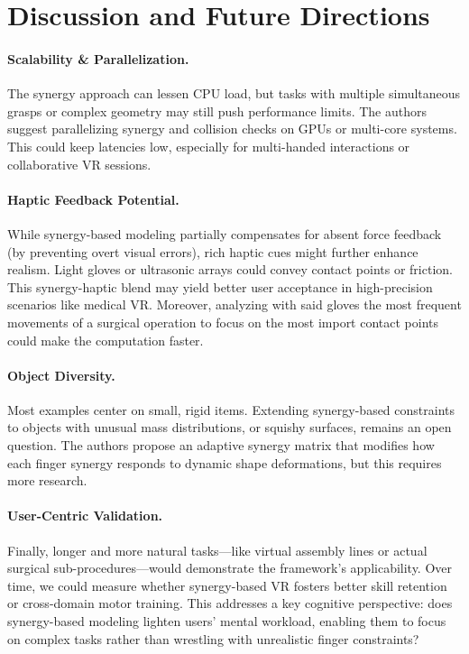 \documentclass[11pt]{llncs}
\begin{document}
\section*{Discussion and Future Directions}
\paragraph{Scalability \& Parallelization.}
The synergy approach can lessen CPU load, but tasks with multiple simultaneous grasps or complex geometry may still push performance limits. The authors suggest parallelizing synergy and collision checks on GPUs or multi-core systems. This could keep latencies low, especially for multi-handed interactions or collaborative VR sessions.

\paragraph{Haptic Feedback Potential.}
While synergy-based modeling partially compensates for absent force feedback (by preventing overt visual errors), rich haptic cues might further enhance realism. Light gloves or ultrasonic arrays could convey contact points or friction. This synergy-haptic blend may yield better user acceptance in high-precision scenarios like medical VR. Moreover, analyzing with said gloves the most frequent movements of a surgical operation to focus on the most import contact points could make the computation faster.

\paragraph{Object Diversity.}
Most examples center on small, rigid items. Extending synergy-based constraints to objects with unusual mass distributions, or squishy surfaces, remains an open question. The authors propose an adaptive synergy matrix that modifies how each finger synergy responds to dynamic shape deformations, but this requires more research.

\paragraph{User-Centric Validation.}
Finally, longer and more natural tasks---like virtual assembly lines or actual surgical sub-procedures---would demonstrate the framework's applicability. Over time, we could measure whether synergy-based VR fosters better skill retention or cross-domain motor training. This addresses a key cognitive perspective: does synergy-based modeling lighten users' mental workload, enabling them to focus on complex tasks rather than wrestling with unrealistic finger constraints?
\end{document}
